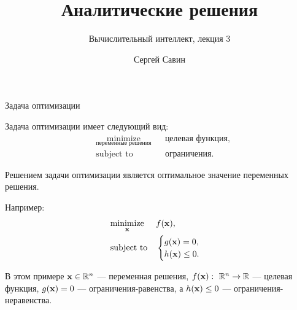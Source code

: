 \documentclass{beamer}
\title{Аналитические решения}
\subtitle{Вычислительный интеллект, лекция 3}
\author{Сергей Савин}
\date{\mydate}
\begin{document}
\maketitle


%
%



\begin{frame}{Задача оптимизации}
	\begin{flushleft}
		
		Задача оптимизации имеет следующий вид:
		\begin{equation}
			\begin{aligned}
				& \underset{\text{переменные решения}}{\text{minimize}}
				& & \text{целевая функция}, \\
				& \text{subject to}
				& & \text{ограничения}.
			\end{aligned}
		\end{equation}
		
		Решением задачи оптимизации является оптимальное значение переменных решения.
		
		\bigskip
		
		Например:
		\begin{equation}
			\begin{aligned}
				& \underset{\mathbf{x}}{\text{minimize}}
				& & f(\mathbf{x}), \\
				& \text{subject to}
				& & \begin{cases}
					g(\mathbf{x}) = 0, \\
					h(\mathbf{x}) \leq 0.
				\end{cases}
			\end{aligned}
		\end{equation}
		
		В этом примере $\mathbf{x} \in \mathbb{R}^n$ — переменная решения, $f(\mathbf{x}): \ \mathbb{R}^n \rightarrow \mathbb{R}$ — целевая функция, $g(\mathbf{x}) = 0$ — ограничения-равенства, а $h(\mathbf{x}) \leq 0$ — ограничения-неравенства.
		
	\end{flushleft}
\end{frame}
\end{document}
